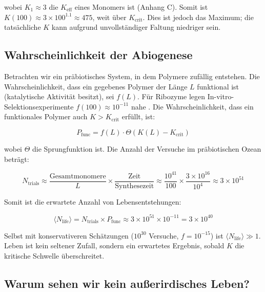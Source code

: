 \documentclass[12pt,a4paper]{article}
\theoremstyle{remark}
\newcommand{\Keff}{K_{\mathrm{eff}}}
\newcommand{\Ntrials}{N_{\mathrm{trials}}}
\newcommand{\Nlife}{\langle N_{\mathrm{life}}\rangle}
\begin{document}
	wobei $K_1 \approx 3$ die $\Keff$ eines Monomers ist (Anhang C). Somit ist $K(100) \approx 3 \times 100^{1.1} \approx 475$, weit über $K_{\text{crit}}$. Dies ist jedoch das Maximum; die tatsächliche $K$ kann aufgrund unvollständiger Faltung niedriger sein.
	
	\subsection{Wahrscheinlichkeit der Abiogenese}
	
	Betrachten wir ein präbiotisches System, in dem Polymere zufällig entstehen. Die Wahrscheinlichkeit, dass ein gegebenes Polymer der Länge $L$ funktional ist (katalytische Aktivität besitzt), sei $f(L)$. Für Ribozyme legen In-vitro-Selektionsexperimente $f(100) \approx 10^{-11}$ nahe \cite{Joyce2002}. Die Wahrscheinlichkeit, dass ein funktionales Polymer auch $K > K_{\text{crit}}$ erfüllt, ist:
	
	\begin{equation}
		P_{\text{func}} = f(L) \cdot \Theta(K(L) - K_{\text{crit}})
		\label{eq:Pfunc}
	\end{equation}
	
	wobei $\Theta$ die Sprungfunktion ist. Die Anzahl der Versuche im präbiotischen Ozean beträgt:
	
	\begin{equation}
		\Ntrials \approx \frac{\text{Gesamtmonomere}}{L} \times \frac{\text{Zeit}}{\text{Synthesezeit}} \approx \frac{10^{41}}{100} \times \frac{3\times 10^{16}}{10^4} \approx 3 \times 10^{51}
		\label{eq:trials}
	\end{equation}
	
	Somit ist die erwartete Anzahl von Lebensentstehungen:
	
	\begin{equation}
		\Nlife = \Ntrials \times P_{\text{func}} \approx 3 \times 10^{51} \times 10^{-11} = 3 \times 10^{40}
		\label{eq:Nlife}
	\end{equation}
	
	Selbst mit konservativeren Schätzungen ($10^{30}$ Versuche, $f=10^{-15}$) ist $\Nlife \gg 1$. Leben ist kein seltener Zufall, sondern ein erwartetes Ergebnis, sobald $K$ die kritische Schwelle überschreitet.
	
	\subsection{Warum sehen wir kein außerirdisches Leben?}
	
\end{document}
